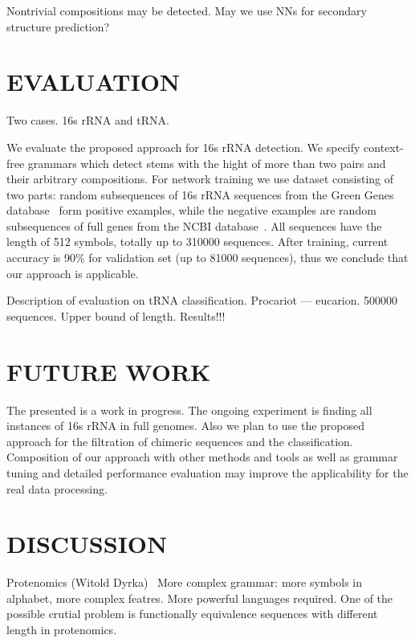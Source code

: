 \documentclass[a4paper,twoside]{article}
\begin{document}
Nontrivial compositions may be detected.
May we use NNs for secondary structure prediction?


\section{\uppercase{Evaluation}}
\label{sec:evaluation}

Two cases. 
16s rRNA and tRNA.

\noindent We evaluate the proposed approach for 16s rRNA detection.
We specify context-free grammars which detect stems with the hight of more than two pairs and their arbitrary compositions.
For network training we use dataset consisting of two parts: random subsequences of 16s rRNA sequences from the Green Genes database~\cite{pmid16820507} form positive examples, while the negative examples are random subsequences of full genes from the NCBI database~\cite{pmid19854944}.
All sequences have the length of 512 symbols, totally up to 310000 sequences.
After training, current accuracy is 90\% for validation set (up to 81000 sequences), thus we conclude that our approach is applicable.

Description of evaluation on tRNA classification.
Procariot --- eucarion.
500000 sequences.
Upper bound of length.
Results!!!

\section{\uppercase{Future Work}}
\label{sec:FutureWork}

\noindent The presented is a work in progress. 
The ongoing experiment is finding all instances of 16s rRNA in full genomes.
Also we plan to use the proposed approach for the filtration of chimeric sequences and the classification.
Composition of our approach with other methods and tools as well as grammar tuning and detailed performance evaluation may improve the applicability for the real data processing.


\section{\uppercase{Discussion}}
\label{sec:Discussion}

Protenomics (Witold Dyrka)~\cite{DBLP:Witold:Proteins}
More complex grammar: more symbols in alphabet, more complex featres.
More powerful languages required.
One of the possible crutial problem is functionally equivalence sequences with different length in protenomics.
\end{document}
